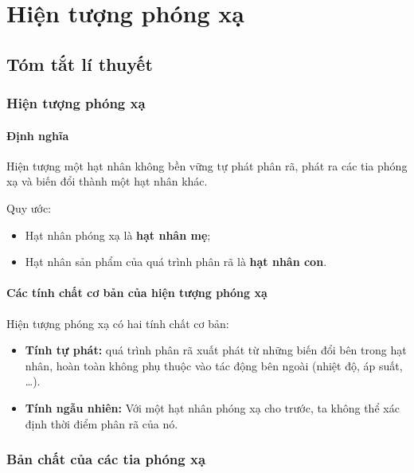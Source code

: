 \section{Hiện tượng phóng xạ}
\subsection{Tóm tắt lí thuyết}
\begin{tomtat}
	\subsubsection{Hiện tượng phóng xạ}
	\paragraph{Định nghĩa}
	\begin{dn}
		Hiện tượng một hạt nhân không bền vững tự phát phân rã, phát ra các tia phóng xạ và biến đổi thành một hạt nhân khác.
	\end{dn}
	Quy ước:
	\begin{itemize}
		\item Hạt nhân phóng xạ là \textbf{hạt nhân mẹ};
		\item Hạt nhân sản phẩm của quá trình phân rã là \textbf{hạt nhân con}.
	\end{itemize}
	\paragraph{Các tính chất cơ bản của hiện tượng phóng xạ}
	Hiện tượng phóng xạ có hai tính chất cơ bản:
	\begin{itemize}
		\item \textbf{Tính tự phát:} quá trình phân rã xuất phát từ những biến đổi bên trong hạt nhân, hoàn toàn không phụ thuộc vào tác động bên ngoài (nhiệt độ, áp suất, \dots).
		\item \textbf{Tính ngẫu nhiên:} Với một hạt nhân phóng xạ cho trước, ta không thể xác định thời điểm phân rã của nó.
	\end{itemize}
	\subsubsection{Bản chất của các tia phóng xạ}

\end{tomtat}
